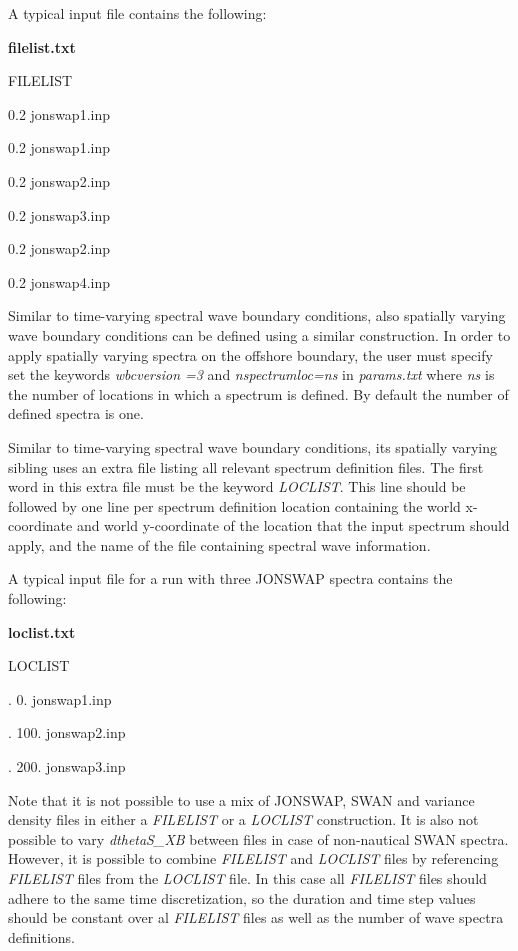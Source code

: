\documentclass{article}
\begin{document}
\noindent A typical input file contains the following:

\noindent \textbf{filelist.txt}

\noindent FILELIST

 0.2 jonswap1.inp

 0.2 jonswap1.inp

 0.2 jonswap2.inp

 0.2 jonswap3.inp

 0.2 jonswap2.inp

 0.2 jonswap4.inp

\noindent Similar to time-varying spectral wave boundary conditions, also spatially varying wave boundary conditions can be defined using a similar construction. In order to apply spatially varying spectra on the offshore boundary, the user must specify set the keywords \textit{wbcversion =3} and \textit{nspectrumloc=ns} in \textit{params.txt} where \textit{ns} is the number of locations in which a spectrum is defined. By default the number of defined spectra is one.

\noindent Similar to time-varying spectral wave boundary conditions, its spatially varying sibling uses an extra file listing all relevant spectrum definition files. The first word in this extra file must be the keyword \textit{LOCLIST}. This line should be followed by one line per spectrum definition location containing the world x-coordinate and world y-coordinate of the location that the input spectrum should apply, and the name of the file containing spectral wave information.

\noindent  A typical input file for a run with three JONSWAP spectra contains the following:

\noindent \textbf{loclist.txt}

\noindent LOCLIST

. 0.    jonswap1.inp

. 100.  jonswap2.inp

. 200.  jonswap3.inp

\noindent Note that it is not possible to use a mix of JONSWAP, SWAN and variance density files in either a \textit{FILELIST} or a \textit{LOCLIST} construction. It is also not possible to vary \textit{dthetaS\_XB} between files in case of non-nautical SWAN spectra. However, it is possible to combine \textit{FILELIST} and \textit{LOCLIST} files by referencing \textit{FILELIST} files from the \textit{LOCLIST} file. In this case all \textit{FILELIST} files should adhere to the same time discretization, so the duration and time step values should be constant over al \textit{FILELIST} files as well as the number of wave spectra definitions.
\end{document}
